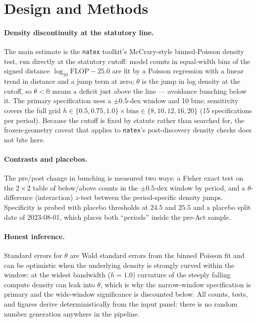 \documentclass[11pt]{article}
\newcommand{\natex}{\texttt{natex}}
\begin{document}
\section{Design and Methods}\label{sec:methods}

\paragraph{Density discontinuity at the statutory line.} The main estimate is
the \natex{} toolkit's \cite{natex} McCrary-style \cite{mccrary2008}
binned-Poisson density test, run directly at the statutory cutoff: model
counts in equal-width bins of the signed distance
$\log_{10}\mathrm{FLOP}-25.0$ are fit by a Poisson regression with a linear
trend in distance and a jump term at zero; $\theta$ is the jump in log density
at the cutoff, so $\theta<0$ means a deficit just above the line ---
avoidance bunching below it. The primary specification uses a $\pm 0.5$-dex
window and 10 bins; sensitivity covers the full grid $h\in\{0.5,0.75,1.0\}
\times \text{bins}\in\{8,10,12,16,20\}$ (15 specifications per period).
Because the cutoff is fixed by statute rather than searched for, the
frozen-geometry caveat that applies to \natex{}'s post-discovery density
checks does not bite here.

\paragraph{Contrasts and placebos.} The pre/post change in bunching is
measured two ways: a Fisher exact test on the $2\times 2$ table of
below/above counts in the $\pm 0.5$-dex window by period, and a
$\theta$-difference (interaction) $z$-test between the period-specific
density jumps. Specificity is probed with placebo thresholds at $24.5$ and
$25.5$ and a placebo split date of 2023-08-01, which places both
``periods'' inside the pre-Act sample.

\paragraph{Honest inference.} Standard errors for $\theta$ are Wald standard
errors from the binned Poisson fit and can be optimistic when the underlying
density is strongly curved within the window; at the widest bandwidth
($h=1.0$) curvature of the steeply falling compute density can leak into
$\theta$, which is why the narrow-window specification is primary and the
wide-window significance is discounted below. All counts, tests, and figures
derive deterministically from the input panel: there is no random number
generation anywhere in the pipeline.
\end{document}
